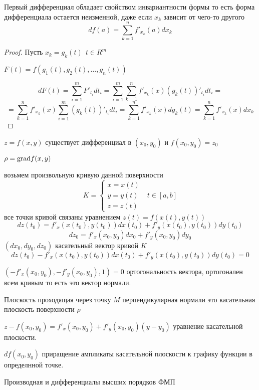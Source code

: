 \begin{theorem}
  Первый дифференциал обладает свойством инвариантности формы то есть
  форма дифференциала остается неизменной, даже если $x_k$ зависит от
  чего-то другого
  $$
  df(a) = \sum_{k=1}^n f'_{x_k}(a) dx_k
  $$
\end{theorem}

\begin{proof}
  Пусть $x_k = g_k(t) ~~ t \in R^m$

  $F(t) = f(g_1(t), g_2(t), \ldots, g_n(t))$

  $$
  dF(t) = \sum_{i=1}^m F'_{t_i}dt_i = \sum_{i=1}^m \sum_{k=1}^n
  f'_{x_k}(x) (g_k(t))'_{t_i}dt_i =
  $$
  $$
  = \sum_{k=1}^n f'_{x_k}(x) \sum_{i=1}^m (g_k(t))'_{t_i} dt_i =
  \sum_{k=1}^n f'_{x_k}(x)dg_k(t) = \sum_{k=1}^n f'_{x_k}(x) dx_k
  $$
\end{proof}

\begin{block}
  $z = f(x, y)$ существует дифференциал в $(x_0, y_0)$ и $f(x_0, y_0) = z_0$

  $\rho = \mathrm{grad} f(x, y)$

  возьмем произвольную кривую данной поверхности
  $$
  K = \left\{
  \begin{array}{l}
    x = x(t) \\
    y = y(t) \\
    z = z(t)
  \end{array}
  \right. ~~~ t \in [a,b]
  $$
  все точки кривой связаны уравнением $z(t) = f(x(t), y(t))$
  $$
  dz(t_0) = f'_x(x(t_0), y(t_0)) dx(t_0) + f'_y(x(t_0), y(t_0))dy(t_0)
  $$
  $$
  dz_0 = f'_x (x_0, y_0)dx_0 + f'_y(x_0, y_0)dy_0
  $$
  $(dx_0, dy_0, dz_0)$ касательный вектор кривой $K$
  $$
  dz(t_0) - f'_x(x(t_0), y(t_0)) dx(t_0) + f'_y(x(t_0), y(t_0))dy(t_0) = 0
  $$

  $(-f'_x(x_0, y_0), -f'_y(x_0, y_0), 1) = 0$ ортогональность вектора,
  ортогонален всем кривым то есть это вектор нормали.

  Плоскость проходящая через точку $M$ перпендикулярная нормали это касательная
  плоскость поверхности $\rho$

  $z - f(x_0, y_0) = f'_x(x_0, y_0) + f'_y(x_0, y_0)(y - y_0)$ уравнение
  касательной плоскости.

  $df(x_0,y_0)$ приращение ампликаты касательной
  плоскости к графику функции в определнной точке.
\end{block}

\begin{title}[\Large]
  Производная и дифференциалы высших порядков ФМП
\end{title}

